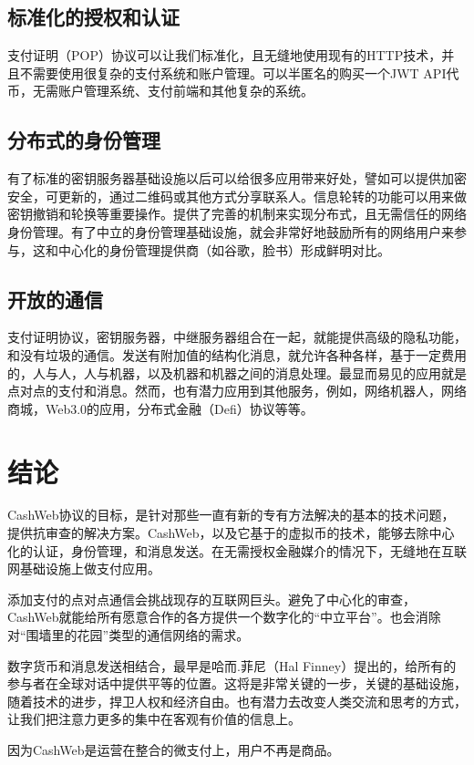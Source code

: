 \documentclass{article}
\begin{document}
\subsection{标准化的授权和认证}

支付证明（POP）协议可以让我们标准化，且无缝地使用现有的HTTP技术，并且不需要使用很复杂的支付系统和账户管理。可以半匿名的购买一个JWT\supercite{rfc7519} API代币，无需账户管理系统、支付前端和其他复杂的系统。

\subsection{分布式的身份管理}

有了标准的密钥服务器基础设施以后可以给很多应用带来好处，譬如可以提供加密安全，可更新的，通过二维码或其他方式分享联系人。信息轮转的功能可以用来做密钥撤销和轮换等重要操作。提供了完善的机制来实现分布式，且无需信任的网络身份管理。有了中立的身份管理基础设施，就会非常好地鼓励所有的网络用户来参与，这和中心化的身份管理提供商（如谷歌，脸书）形成鲜明对比。

\subsection{开放的通信}

支付证明协议，密钥服务器，中继服务器组合在一起，就能提供高级的隐私功能，和没有垃圾的通信。发送有附加值的结构化消息，就允许各种各样，基于一定费用的，人与人，人与机器，以及机器和机器之间的消息处理。最显而易见的应用就是点对点的支付和消息。然而，也有潜力应用到其他服务，例如，网络机器人，网络商城，Web3.0的应用，分布式金融（Defi）协议等等。

\section{结论}

CashWeb协议的目标，是针对那些一直有新的专有方法解决的基本的技术问题，提供抗审查的解决方案。CashWeb，以及它基于的虚拟币的技术，能够去除中心化的认证，身份管理，和消息发送。在无需授权金融媒介的情况下，无缝地在互联网基础设施上做支付应用。

添加支付的点对点通信会挑战现存的互联网巨头。避免了中心化的审查，CashWeb就能给所有愿意合作的各方提供一个数字化的``中立平台''。也会消除对``围墙里的花园''类型的通信网络的需求。

数字货币和消息发送相结合，最早是哈而.菲尼（Hal Finney\supercite{finney2004rpow}）提出的，给所有的参与者在全球对话中提供平等的位置。这将是非常关键的一步，关键的基础设施，随着技术的进步，捍卫人权和经济自由。也有潜力去改变人类交流和思考的方式，让我们把注意力更多的集中在客观有价值的信息上。

因为CashWeb是运营在整合的微支付上，用户不再是商品。

\printbibliography
\end{document}
